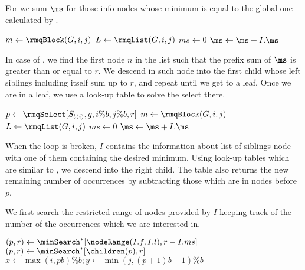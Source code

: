 For \rmqSizeBlock{} we sum $\ms$ for those info-nodes whose minimum is equal to the global one calculated by \rmq{}.

\begin{algorithm}
\begin{algorithmic}
		\State \Return{$\rmqSize[S_{b(i)}, g, i \% b, j \% b]$}
	\Else
		\State $m \gets \rmqBlock(G, i, j)$
		\State $L \gets \rmqList(G, i, j)$
		\State $ms \gets 0$
				\State $\ms \gets \ms + I.\ms$
			\EndIf
		\EndFor
		\State \Return{$\ms$}
	\EndIf
\EndFunction
\end{algorithmic}
\end{algorithm}

In case of \rmqSelect{}, we find the first node $n$ in the list such that the prefix sum of $\ms$ is greater than or equal to $r$.
We descend in such node into the first child whose left siblings including itself sum up to $r$, and repeat until we get to a leaf.
Once we are in a leaf, we use a look-up table to solve the select there.

\begin{algorithm}
\begin{algorithmic}
 
		\State $p \gets \rmqSelect[S_{b(i)}, g, i \% b, j \% b, r]$
		\State {}
	\Else
		\State $m \gets \rmqBlock(G, i, j)$
		\State $L \gets \rmqList(G, i, j)$
		\State $ms \gets 0$
					\State \Break
				\EndIf
				\State $\ms \gets \ms + I.\ms$
			\EndIf
		\EndFor
{}
\end{algorithmic}
\end{algorithm}

When the loop is broken, $I$ contains the information about list of siblings node with one of them containing the desired minimum.
Using look-up tables which are similar to \nodeSearch{}, we descend into the right child.
The table also returns the new remaining number of occurrences by subtracting those which are in nodes before $p$.

We first search the restricted range of nodes provided by $I$ keeping track of the number of the occurrences which we are interested in.

\begin{algorithm}
\begin{algorithmic}
		\State $(p, r) \gets \minSearch^*[\nodeRange(I.f, I.l), r - I.ms]$
			\State $(p, r) \gets \minSearch^*[\children(p), r]$
		\EndWhile
		\State $x \gets \max(i, p b) \% b; y \gets \min(j, (p + 1) b - 1) \% b$
		\State {}
	\EndIf
\EndFunction
\end{algorithmic}
\end{algorithm}

